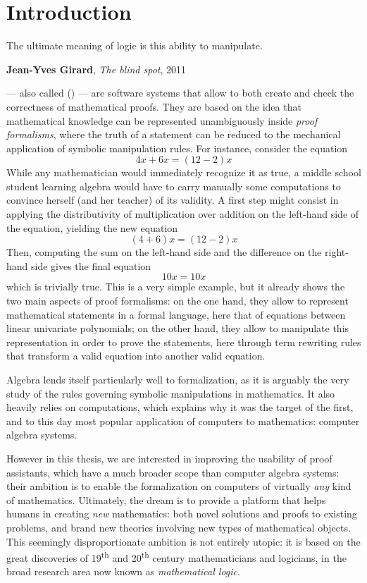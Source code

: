 \setchapterpreamble[u]{\margintoc}
\chapter{Introduction}

\epigraph{The ultimate meaning of logic is this ability to manipulate.}
{\textbf{Jean-Yves Girard}, \textit{The blind spot}, 2011}


 --- also called 
() --- are software systems that allow to both create and check
the correctness of mathematical proofs. They are based on the idea that
mathematical knowledge can be represented unambiguously inside \emph{proof
formalisms}, where the truth of a statement can be reduced to the mechanical
application of symbolic manipulation rules. For instance, consider the equation
$$4x + 6x = (12 - 2)x$$ 
While any mathematician would immediately recognize it as true, a middle school
student learning algebra would have to carry manually some computations to
convince herself (and her teacher) of its validity. A first step might consist
in applying the distributivity of multiplication over addition on the left-hand
side of the equation, yielding the new equation
$$(4 + 6)x = (12 - 2)x$$
Then, computing the sum on the left-hand side and the difference on the
right-hand side gives the final equation
$$10x = 10x$$
which is trivially true. This is a very simple example, but it already shows the
two main aspects of proof formalisms: on the one hand, they allow to represent
mathematical statements in a formal language, here that of equations between
linear univariate polynomials; on the other hand, they allow to manipulate
this representation in order to prove the statements, here through term
rewriting rules that transform a valid equation into another valid equation.

Algebra lends itself particularly well to formalization, as it is arguably the
very study of the rules governing symbolic manipulations in mathematics. It also
heavily relies on computations, which explains why it was the target of the
first, and to this day most popular application of computers to mathematics:
computer algebra systems.

However in this thesis, we are interested in improving the usability of proof
assistants, which have a much broader scope than computer algebra systems: their
ambition is to enable the formalization on computers of virtually \emph{any}
kind of mathematics. Ultimately, the dream is to provide a platform that helps
humans in creating \emph{new} mathematics: both novel solutions and proofs to
existing problems, and brand new theories involving new types of mathematical
objects. This seemingly disproportionate ambition is not entirely utopic: it is
based on the great discoveries of 19\textsuperscript{th} and
20\textsuperscript{th} century mathematicians and logicians, in the broad
research area now known as \emph{mathematical logic}.


